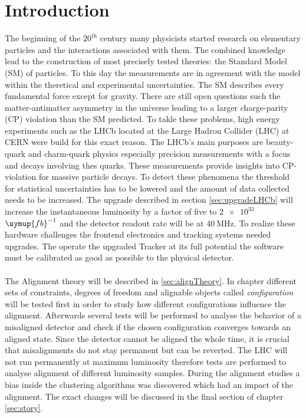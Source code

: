 \chapter{Introduction}
\label{sec:einleitung}

The beginning of the $20^{\text{th}}$ century many physicists started research on
elementary particles and the interactions associated with them. The combined
knowledge lead to the construction of most precisely tested theories: the
Standard Model (SM) of particles. To this day the measurements are in agreement
with the model within the theretical and experimental uncertainties.
The SM describes every fundamental force except for gravity. There are still open
questions such the matter-antimatter asymmetry in the universe leading to a larger
charge-parity (CP) violation than the SM predicted.
To takle these problems, high energy experiments such as the LHCb located at the
Large Hadron Collider (LHC) at CERN were build for this exact reason.
The LHCb's main purposes are beauty-quark and charm-quark physics especially
precision measurements with a focus and decays involving thes quarks.
These measurements provide insights into CP-violation for massive
particle decays.
To detect these phenomena the threshold for statistical uncertainties has to
be lowered and the amount of data collected needs to be increased. The upgrade
described in section \ref{sec:upgradeLHCb} will increase the instantaneous
luminosity by a factor of five to $\num{2e33}$ $\symup{fb}^{-1}$ and
the detector readout rate will be at $\SI{40}{\mega\hertz}$. To realize these
hardware challenges the frontend electronics and tracking systems needed upgrades.
The operate the upgraded Tracker at its full potential the software must be
calibrated as good as possible to the physical detector.
\\
\\
The Alignment theory will be described in \ref{sec:alignTheory}.
In chapter \label{sec:story} different sets of constraints, degrees of freedom
and alignable objects called \textit{configuration} will be tested first in order
to study how different configurations influence the alignment. Afterwards several
tests will be performed to analyse the behavior of a misaligned detector and check
if the chosen configuration converges towards an aligned state. Since the detector
cannot be aligned the whole time, it is crucial that misalignments do not stay
permanent but can be reverted.
The LHC will not run permanently at maximum luminosity therefore tests are performed
to analyse alignment of different luminosity samples.
During the alignment studies a bias inside the clustering algorithms was discovered
which had an impact of the alignment. The exact changes will be discussed in the final section of chapter \ref{sec:story}.
